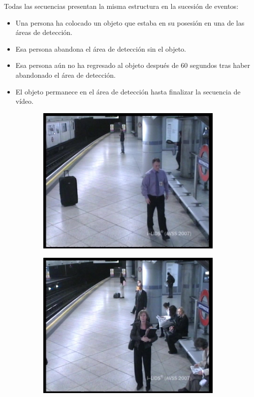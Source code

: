 Todas las secuencias presentan la misma estructura en la sucesión de eventos:

\begin{itemize}
    \item Una persona ha colocado un objeto que estaba en su posesión en una de las áreas de detección.
    \item Esa persona abandona el área de detección sin el objeto.
    \item Esa persona aún no ha regresado al objeto después de 60 segundos tras haber abandonado el área de detección.
    \item El objeto permanece en el área de detección hasta finalizar la secuencia de vídeo.
\end{itemize}

\begin{figure}[ht]
  \centering
  \begin{subfigure}[b]{0.4\textwidth}
    \includegraphics[width=\textwidth]{img/chapters/resultados/datasets/AVSSAB_1.jpg}
    \caption{}
    \label{fig:avssab2007_1}
  \end{subfigure}
  \qquad\qquad
  \begin{subfigure}[b]{0.4\textwidth}
    \includegraphics[width=\textwidth]{img/chapters/resultados/datasets/AVSSAB_2.jpg}

\end{subfigure}
\end{figure}
